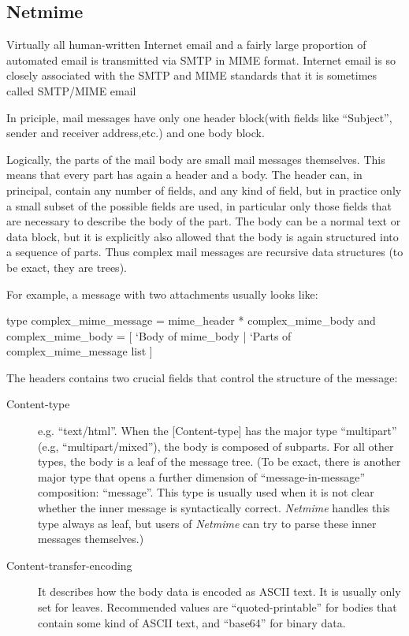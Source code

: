 \subsection{Netmime}
Virtually all human-written Internet email and a fairly large
proportion of automated email is transmitted via SMTP in MIME
format. Internet email is so closely associated with the SMTP and MIME
standards that it is sometimes called SMTP/MIME email

In priciple, mail messages have only one header block(with fields like
``Subject'', sender and receiver address,etc.) and one body block.

Logically, the parts of the mail body are small mail messages themselves.
This means that every part has again a header and a body. The header
can, in principal, contain any number of fields, and any kind of field,
but in practice only a small subset of the possible fields are used,
in particular only those fields that are necessary to describe the body of the 
part. The body can be a normal text or data block, but it is explicitly
also allowed that the body is again structured into a sequence of parts.
Thus complex mail messages are recursive data structures (to be exact,
they are trees).

For example, a message with two attachments usually looks like:

\begin{ocamlcode}
  type complex_mime_message = mime_header * complex_mime_body
  and complex_mime_body =
  [ `Body of mime_body
  | `Parts of complex_mime_message list ]
\end{ocamlcode}

The headers contains two crucial fields that control the structure of
the message:

\begin{description}
\item[Content-type] e.g. ``text/html''.
  When the [Content-type] has the major type ``multipart''
  (e.g, ``multipart/mixed''), the body is composed of subparts.
  For all other types, the body is a leaf of the message
  tree. (To be exact, there is another major type that opens a further
  dimension of ``message-in-message'' composition: ``message''. This type
  is usually used when it is not clear whether the inner message is
  syntactically correct. \textit{Netmime} handles this type always as
  leaf, but users of \textit{Netmime} can try to parse these inner messages
  themselves.)
\item[Content-transfer-encoding] It describes how the body data is
  encoded as ASCII text. It is usually only set for leaves.
  Recommended values are ``quoted-printable'' for bodies that contain
  some kind of ASCII text, and ``base64'' for binary data.
\end{description}

